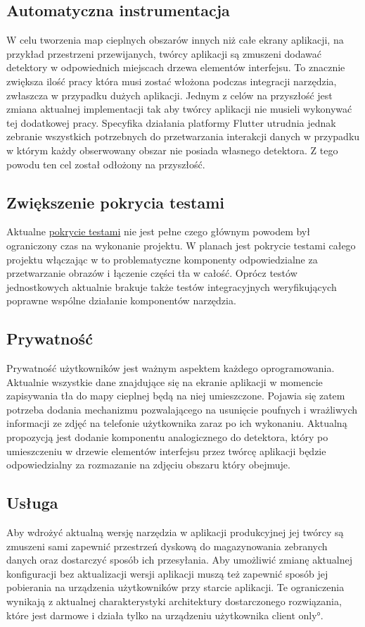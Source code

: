 \subsection{Automatyczna instrumentacja}
\label{sec:auto_instrumentation}
W celu tworzenia map cieplnych obszarów innych niż całe ekrany aplikacji, na przykład przestrzeni przewijanych, twórcy aplikacji są zmuszeni dodawać detektory w odpowiednich miejscach drzewa elementów interfejsu. To znacznie zwiększa ilość pracy która musi zostać włożona podczas integracji narzędzia, zwłaszcza w przypadku dużych aplikacji. Jednym z celów na przyszłość jest zmiana aktualnej implementacji tak aby twórcy aplikacji nie musieli wykonywać tej dodatkowej pracy. Specyfika działania platformy Flutter utrudnia jednak zebranie wszystkich potrzebnych do przetwarzania interakcji danych w przypadku w którym każdy obserwowany obszar nie posiada własnego detektora. Z tego powodu ten cel został odłożony na przyszłość.

\subsection{Zwiększenie pokrycia testami}
\label{sec:future_coverage}
Aktualne \hyperref[par:test_coverage]{pokrycie testami} nie jest pełne czego głównym powodem był ograniczony czas na wykonanie projektu. W planach jest pokrycie testami całego projektu włączając w to problematyczne komponenty odpowiedzialne za przetwarzanie obrazów i łączenie części tła w całość. Oprócz testów jednostkowych aktualnie brakuje także testów integracyjnych weryfikujących poprawne wspólne działanie komponentów narzędzia.

\subsection{Prywatność}
Prywatność użytkowników jest ważnym aspektem każdego oprogramowania. Aktualnie wszystkie dane znajdujące się na ekranie aplikacji w momencie zapisywania tła do mapy cieplnej będą na niej umieszczone. Pojawia się zatem potrzeba dodania mechanizmu pozwalającego na usunięcie poufnych i wrażliwych informacji ze zdjęć na telefonie użytkownika zaraz po ich wykonaniu. Aktualną propozycją jest dodanie komponentu analogicznego do detektora, który po umieszczeniu w drzewie elementów interfejsu przez twórcę aplikacji będzie odpowiedzialny za rozmazanie na zdjęciu obszaru który obejmuje.

\subsection{Usługa}
Aby wdrożyć aktualną wersję narzędzia w aplikacji produkcyjnej jej twórcy są zmuszeni sami zapewnić przestrzeń dyskową do magazynowania zebranych danych oraz dostarczyć sposób ich przesyłania. Aby umożliwić zmianę aktualnej konfiguracji bez aktualizacji wersji aplikacji muszą też zapewnić sposób jej pobierania na urządzenia użytkowników przy starcie aplikacji. Te ograniczenia wynikają z aktualnej charakterystyki architektury dostarczonego rozwiązania, które jest darmowe i działa tylko na urządzeniu użytkownika \ang{client only}.

